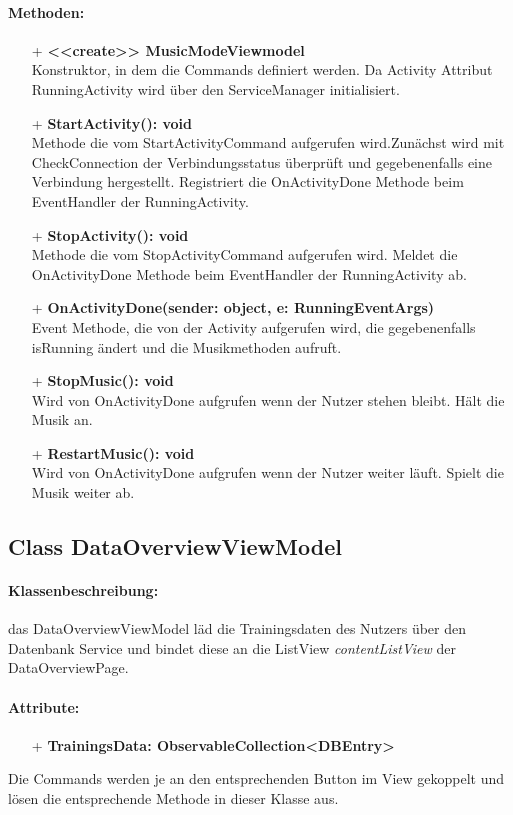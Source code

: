 \documentclass[a4paper,12pt]{article}
\begin{document}
\paragraph{Methoden:}
\begin{itemize}
	\item[+] \textbf{<<create>> MusicModeViewmodel} \\ Konstruktor, in dem die Commands definiert werden. Da Activity Attribut RunningActivity wird über den ServiceManager initialisiert.
	\item[+] \textbf{StartActivity(): void} \\ Methode die vom StartActivityCommand aufgerufen wird.Zunächst wird mit CheckConnection der Verbindungsstatus überprüft und gegebenenfalls eine Verbindung hergestellt. Registriert die OnActivityDone Methode beim EventHandler der RunningActivity. 
	\item[+] \textbf{StopActivity(): void} \\ Methode die vom StopActivityCommand aufgerufen wird. Meldet die OnActivityDone Methode beim EventHandler der RunningActivity ab. 
	\item[+] \textbf{OnActivityDone(sender: object, e: RunningEventArgs)} \\ Event Methode, die von der Activity aufgerufen wird, die gegebenenfalls isRunning ändert und die Musikmethoden aufruft.
	\item[+] \textbf{StopMusic(): void} \\ Wird von OnActivityDone aufgrufen wenn der Nutzer stehen bleibt. Hält die Musik an.
	\item[+] \textbf{RestartMusic(): void} \\ Wird von OnActivityDone aufgrufen wenn der Nutzer weiter läuft. Spielt die Musik weiter ab.
\end{itemize}

\subsection{Class DataOverviewViewModel}
\paragraph{Klassenbeschreibung:}
das DataOverviewViewModel läd die Trainingsdaten des Nutzers über den Datenbank Service und bindet diese an die ListView \textit{contentListView} der DataOverviewPage.
\paragraph{Attribute:}
\begin{itemize}
	\item[+] \textbf{TrainingsData: ObservableCollection<DBEntry>}
\end{itemize}
Die Commands werden je an den entsprechenden Button im View gekoppelt und lösen die entsprechende Methode in dieser Klasse aus.
\end{document}

